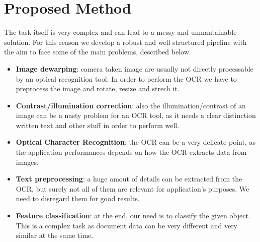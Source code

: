 \documentclass[10pt,twocolumn,letterpaper]{article}
\begin{document}
\section{Proposed Method}
\label{sec:proposed-method}

The task itself is very complex and can lead to a messy and
unmantainable solution. For this reason we develop a robust and well
structured pipeline with the aim to face some of the main problems,
described below.

\begin{itemize}
  \item \textbf{Image dewarping}: camera taken image are usually not directly
    processable by an optical recognition tool. In order to perform
    the OCR we have to preprocess the image and rotate, resize and
    strech it.
  \item \textbf{Contrast/illumination correction}: also the
    illumination/contrast of an image can be a nasty problem for an
    OCR tool, as it needs a clear distinction written text and other
    stuff in order to perform well.
  \item \textbf{Optical Character Recognition}: the OCR can be a very delicate
    point, as the application performances depends on how the OCR
    extracts data from images.
  \item \textbf{Text preprocessing}: a huge amout of details can be extracted
    from the OCR, but surely not all of them are relevant for
    application's purposes. We need to disregard them for good results.
  \item \textbf{Feature classification}: at the end, our need is to classify
    the given object. This is a complex task as document data can be
    very different and very similar at the same time.
\end{itemize}
\end{document}
